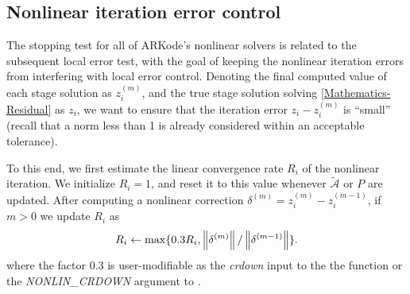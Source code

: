 \documentclass[letterpaper,10pt,english]{sphinxmanual}
\begin{document}
\subsection{Nonlinear iteration error control}
\label{Mathematics:nonlinear-iteration-error-control}\label{Mathematics:mathematics-error-nonlinear}
The stopping test for all of ARKode's nonlinear solvers is related to
the subsequent local error test, with the goal of keeping the
nonlinear iteration errors from interfering with local error control.
Denoting the final computed value of each stage solution as
\(z_i^{(m)}\), and the true stage solution solving \eqref{Mathematics-Residual}
as \(z_i\), we want to ensure that the iteration error
\(z_i - z_i^{(m)}\) is ``small'' (recall that a norm less than 1 is
already considered within an acceptable tolerance).

To this end, we first estimate the linear convergence rate \(R_i\)
of the nonlinear iteration.  We initialize \(R_i=1\), and reset it
to this value whenever \(\tilde{\mathcal A}\) or \(P\) are
updated.  After computing a nonlinear correction \(\delta^{(m)} =
z_i^{(m)} - z_i^{(m-1)}\), if \(m>0\) we update \(R_i\) as
\begin{gather}
\begin{split}R_i \leftarrow \max\{ 0.3 R_i, \left\|\delta^{(m)}\right\| / \left\|\delta^{(m-1)}\right\| \}.\end{split}\notag
\end{gather}
where the factor 0.3 is user-modifiable as the \emph{crdown} input to the
the function {\hyperref[c_interface/User_callable:c.ARKodeSetNonlinCRDown]{\emph{}}} or the \emph{NONLIN\_CRDOWN}
argument to {\hyperref[f_interface/Usage:f/_/FARKSETRIN]{\emph{}}}.
\end{document}
